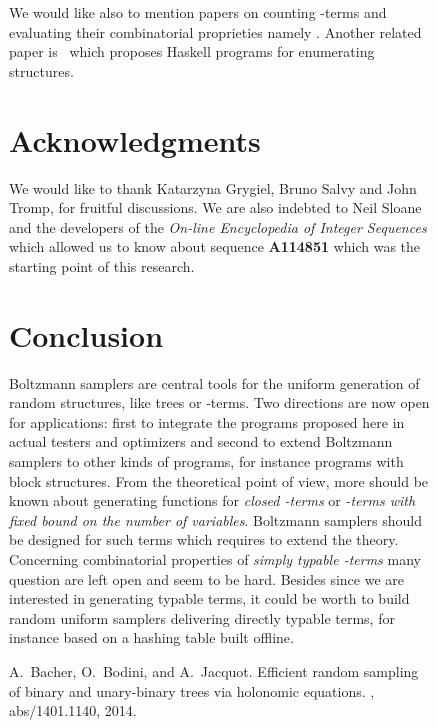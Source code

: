 \documentclass{sig-alternate}
\begin{document}
\begin{figure*}[!t]
We would like also to mention papers on counting
\mbox{-terms} \cite{DBLP:journals/tcs/Lescanne13,DBLP:journals/jfp/GrygielL13} and
evaluating their combinatorial proprieties
namely \cite{bodini11:_lambd_bound_unary_heigh,DBLP:journals/corr/abs-0903-5505,DBLP:journals/combinatorics/BodiniGGJ13,DBLP:journals/tcs/BodiniGJ13}.
Another related paper is~\cite{DBLP:conf/haskell/DuregardJW12} which proposes
\textsf{Haskell} programs for enumerating structures.

\section{Acknowledgments}

We would like to thank Katarzyna Grygiel, Bruno Salvy and John Tromp,
for fruitful discussions.  We are also indebted to Neil Sloane and the developers of
the \emph{On-line Encyclopedia of Integer Sequences} which allowed us to know about
sequence \textbf{A114851} which was the starting point of this research.

\section{Conclusion}

Boltzmann samplers are central tools for the uniform generation of random
structures, like trees or -terms.  Two directions are now open for applications:
first to integrate the programs proposed here in actual testers and optimizers and
second to extend Boltzmann samplers to other kinds of programs, for instance programs
with block structures. From the theoretical point of view, more should be known about
generating functions for \emph{closed -terms} or \emph{-terms with fixed bound on the
number of variables}.  Boltzmann samplers should be designed for such terms which
requires to extend the theory. Concerning combinatorial properties of \emph{simply typable
-terms} many question are left open and seem to be hard. Besides since we are interested
in generating typable terms, it could be worth to build random uniform samplers
 delivering directly typable terms, for instance based on a hashing table built offline. 

\begin{thebibliography}{10}

A.~Bacher, O.~Bodini, and A.~Jacquot.
\newblock Efficient random sampling of binary and unary-binary trees via
  holonomic equations.
, abs/1401.1140, 2014.


\end{thebibliography}
\end{figure*}
\end{document}
